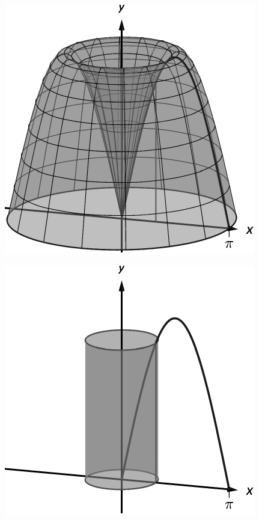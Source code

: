 \documentclass[10pt]{article}
\begin{document}
\includegraphics{figshell4b_3DBW.pdf}
\texttt{}

\includegraphics{figshell4c_3DBW.pdf}
\texttt{}
\end{document}
